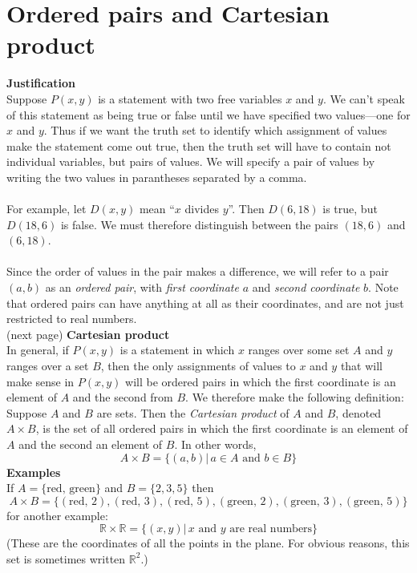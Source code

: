 \documentclass{report}
\theoremstyle{definition}
\begin{document}
\section{Ordered pairs and Cartesian product}
\textbf{Justification}\\
Suppose $P(x,y)$ is a statement with two free variables $x$ and $y$. We can't speak of this statement as being true or false until we have specified two values---one for $x$ and $y$.
Thus if we want the truth set to identify which assignment of values make the statement come out true, then the truth set will have to contain not individual variables, but pairs of
values. We will specify a pair of values by writing the two values in parantheses separated by a comma.\\
\vspace{1mm}\\
For example, let $D(x,y)$ mean ``$x$ divides $y$''. Then $D(6,18)$ is true, but $D(18,6)$ is false.
We must therefore distinguish between the pairs $(18,6)$ and $(6,18)$.\\
\vspace{1mm}\\
Since the order of values in the pair makes a difference, we will refer to a pair $(a,b)$ as an \textit{ordered pair}, with \textit{first coordinate} $a$ and \textit{second coordinate} $b$. Note 
that ordered pairs can have anything at all as their coordinates, and are not just restricted to real numbers.\\
(next page)\newpage
\noindent\textbf{Cartesian product}\\
In general, if $P(x,y)$ is a statement in which $x$ ranges over some set $A$ and $y$ ranges over a set $B$, then the only assignments of values to $x$ and $y$ that will make sense 
in $P(x,y)$ will be ordered pairs in which the first coordinate is an element of $A$ and the second from $B$. We therefore make the following definition:
 Suppose $A$ and $B$ are sets. Then the \textit{Cartesian product} of $A$ and $B$, denoted $A\times B$, is the set of all ordered pairs in which the first coordinate is an element
of $A$ and the second an element of $B$. In other words,
\begin{equation*}
A\times B=\{(a,b)|\,a\in A\text{ and }b\in B\}
\end{equation*}
\textbf{Examples}\\
If $A=\{\text{red, green}\}$ and $B=\{2,3,5\}$ then 
\begin{equation*}
A\times B=\{(\text{red, 2}),(\text{red, 3}),(\text{red, 5}),(\text{green, 2}),
(\text{green, 3}),(\text{green, 5})\}
\end{equation*}
for another example:
\begin{equation*}
\mathbb{R}\times\mathbb{R}=\{(x,y)|\,\text{$x$ and $y$ are real numbers}\}
\end{equation*}
(These are the coordinates of all the points in the plane. For obvious reasons, this set is sometimes written $\mathbb R^2$.)
\newpage
\end{document}
